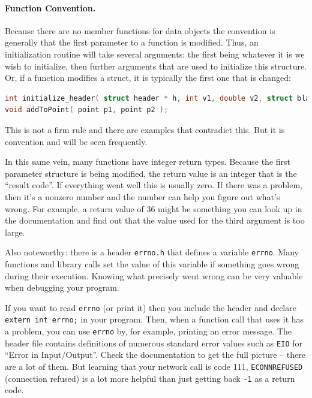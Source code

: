 \documentclass[a4paper]{report}
\begin{document}
\paragraph{Function Convention.}

Because there are no member functions for data objects the convention is generally that the first parameter to a function is modified. Thus, an initialization routine will take several arguments: the first being whatever it is we wish to initialize, then further arguments that are used to initialize this structure. Or, if a function modifies a struct, it is typically the first one that is changed:

\begin{lstlisting}[language=C]
int initialize_header( struct header * h, int v1, double v2, struct blah * v3 );
void addToPoint( point p1, point p2 );
\end{lstlisting}

This is not a firm rule and there are examples that contradict this. But it is convention and will be seen frequently.

In this same vein, many functions have integer return types. Because the first parameter structure is being modified, the return value is an integer that is the ``result code''. If everything went well this is usually zero. If there was a problem, then it's a nonzero number and the number can help you figure out what's wrong. For example, a return value of 36 might be something you can look up in the documentation and find out that the value used for the third argument is too large.

Also noteworthy: there is a header \texttt{errno.h} that defines a variable \texttt{errno}. Many functions and library calls set the value of this variable if something goes wrong during their execution. Knowing what precisely went wrong can be very valuable when debugging your program.

If you want to read \texttt{errno} (or print it) then you include the header and declare \texttt{extern int errno;}  in your program. Then, when a function call that uses it has a problem, you can use \texttt{errno} by, for example, printing an error message. The header file contains definitions of numerous standard error values such as \texttt{EIO} for ``Error in Input/Output''. Check the documentation to get the full picture -- there are a lot of them. But learning that your network call is code 111, \texttt{ECONNREFUSED} (connection refused) is a lot more helpful than just getting back \texttt{-1} as a return code.
\end{document}
